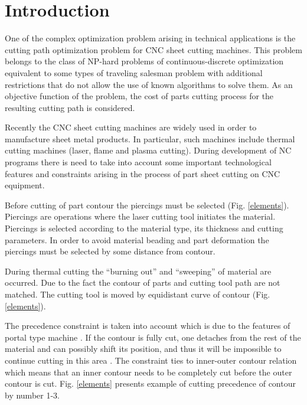 \documentclass[runningheads]{llncs}
\begin{document}
\section{Introduction}

One of the complex optimization problem arising in technical applications
is the cutting path optimization problem for CNC sheet cutting machines.
This problem belongs to the class of NP-hard problems
of continuous-discrete optimization
equivalent to some types of traveling salesman problem
with additional restrictions
that do not allow the use of known algorithms to solve them.
As an objective function of the problem,
the cost of parts cutting process for the resulting cutting path is considered.

Recently the CNC sheet cutting machines are widely used in order to manufacture sheet metal products.
In particular, such machines include thermal cutting machines
(laser, flame and plasma cutting).
During development of NC programs
there is need to take into account
some important technological features and constraints
arising in the process of part sheet cutting on CNC equipment.

Before cutting of part contour the piercings must be selected (Fig. \ref{elements}).
Piercings are operations where the laser cutting tool initiates the material.
Piercings is selected according to the material type, its thickness and cutting parameters.
In order to avoid material beading and part deformation
the piercings must be selected by some distance from contour.

During thermal cutting the ``burning out'' and ``sweeping'' of material are occurred.
Due to the fact the contour of parts and cutting tool path are not matched.
The cutting tool is moved by equidistant curve of contour (Fig. \ref{elements}).

The precedence constraint is taken into account
which is due to the features of portal type machine \cite{ru01,ru02}.
If the contour is fully cut,
one detaches from the rest of the material
and can possibly shift its position,
and thus it will be impossible to continue cutting in this area \cite{Dewil2015}.
The constraint ties to inner-outer contour relation which means that
an inner contour needs to be completely cut before the outer contour is cut.
Fig. \ref{elements} presents example of cutting precedence of contour by number 1-3.
\end{document}
